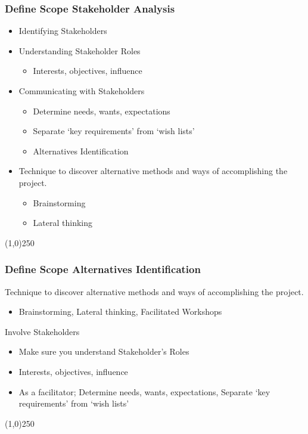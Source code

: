 \begin{frame}
\frametitle{Define Scope \hfill Stakeholder Analysis}
\begin{itemize}
	\item Identifying Stakeholders
	\item Understanding Stakeholder Roles
	\begin{itemize}
		\item Interests, objectives, influence
	\end{itemize}
	\item Communicating with Stakeholders
	\begin{itemize}
		\item	Determine needs, wants, expectations
		\item	Separate `key requirements' from `wish lists'
		\item Alternatives Identification
	\end{itemize}
	\item Technique to discover alternative methods and ways of accomplishing the project.
	\begin{itemize}
		\item Brainstorming
		\item Lateral thinking
	\end{itemize}
\end{itemize}
\end{frame}\begin{center}\line(1,0){250}\end{center}



\begin{frame}
\frametitle{Define Scope \hfill Alternatives Identification}
Technique to discover alternative methods and ways of accomplishing the project.
\begin{itemize}
	\item Brainstorming, Lateral thinking, Facilitated Workshops
\end{itemize}
Involve Stakeholders
\begin{itemize}
	\item Make sure you understand Stakeholder's Roles
	\item Interests, objectives, influence
	\item As a facilitator; Determine needs, wants, expectations, Separate `key requirements' from `wish lists'
\end{itemize}
\end{frame}\begin{center}\line(1,0){250}\end{center}



